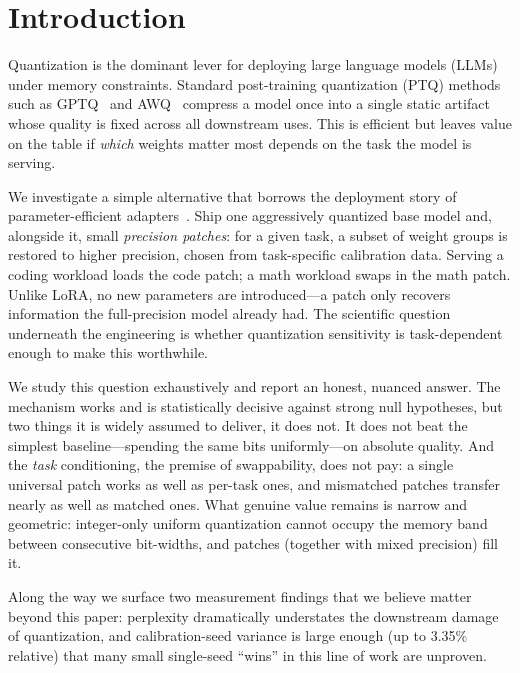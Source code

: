 \documentclass[11pt]{article}
\begin{document}
\section{Introduction}

Quantization is the dominant lever for deploying large language models (LLMs)
under memory constraints. Standard post-training quantization (PTQ) methods
such as GPTQ~\cite{frantar2022gptq} and AWQ~\cite{lin2023awq} compress a model
once into a single static artifact whose quality is fixed across all
downstream uses. This is efficient but leaves value on the table if
\emph{which} weights matter most depends on the task the model is serving.

We investigate a simple alternative that borrows the deployment story of
parameter-efficient adapters~\cite{hu2021lora}. Ship one aggressively
quantized base model and, alongside it, small \emph{precision patches}: for a
given task, a subset of weight groups is restored to higher precision, chosen
from task-specific calibration data. Serving a coding workload loads the code
patch; a math workload swaps in the math patch. Unlike LoRA, no new parameters
are introduced---a patch only recovers information the full-precision model
already had. The scientific question underneath the engineering is whether
quantization sensitivity is task-dependent enough to make this worthwhile.

We study this question exhaustively and report an honest, nuanced answer. The
mechanism works and is statistically decisive against strong null hypotheses,
but two things it is widely assumed to deliver, it does not. It does not beat
the simplest baseline---spending the same bits uniformly---on absolute quality.
And the \emph{task} conditioning, the premise of swappability, does not pay: a
single universal patch works as well as per-task ones, and mismatched patches
transfer nearly as well as matched ones. What genuine value remains is narrow
and geometric: integer-only uniform quantization cannot occupy the memory band
between consecutive bit-widths, and patches (together with mixed precision)
fill it.

Along the way we surface two measurement findings that we believe matter
beyond this paper: perplexity dramatically understates the downstream damage
of quantization, and calibration-seed variance is large enough (up to 3.35\%
relative) that many small single-seed ``wins'' in this line of work are
unproven.
\end{document}
